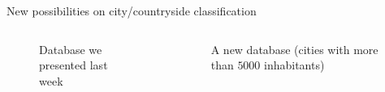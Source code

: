\begin{frame}{New possibilities on city/countryside classification}
    \begin{columns}
        \begin{column}{0.4\paperwidth}
            \begin{figure}
                \caption{Database we presented last week}
            \end{figure}
        \end{column}
        \begin{column}{0.4\paperwidth}
            \begin{figure}
                \caption{A new database (cities with more than $5000$ inhabitants)}
            \end{figure}
        \end{column}
    \end{columns}
\end{frame}

